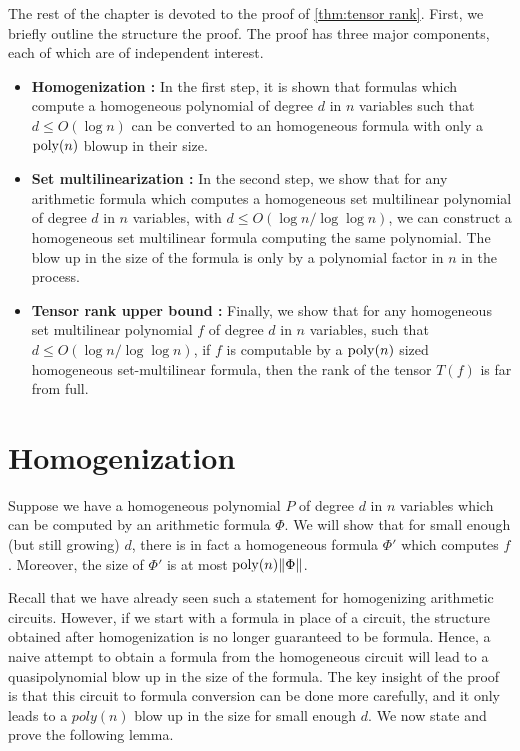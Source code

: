 The rest of the chapter is devoted to the proof of \autoref{thm:tensor rank}. First, we briefly outline the structure the proof. The proof has three major components, each of which are of independent interest. 
\begin{itemize}
\item {\bf Homogenization :} In the first step, it is shown that formulas which compute a homogeneous polynomial of degree $d$ in $n$ variables such that $d \leq O(\log n)$ can be converted to an homogeneous formula with only a $\operatorname{poly}(n)$ blowup in their size. 
\item {\bf Set multilinearization :} In the second step, we show that for any arithmetic formula which computes a homogeneous  set multilinear  polynomial of degree $d$ in $n$ variables, with $d \leq O(\log n/\log \log n)$, we can construct a homogeneous set multilinear formula computing the same polynomial. The blow up in the size of the formula is only by a polynomial factor in $n$ in the process. 
\item {\bf Tensor rank upper bound :} Finally, we  show that for any homogeneous set multilinear polynomial $f$ of degree $d$ in $n$ variables, such that $d \leq O(\log n/\log \log n) $, if $f$ is computable by a $\operatorname{poly}(n)$ sized homogeneous set-multilinear formula, then the rank of the tensor $T(f)$ is far from full. 
\end{itemize}


\section{Homogenization}\label{sec:homogenization}

Suppose we have a homogeneous polynomial $P$ of degree $d$ in $n$ variables which can be computed by an arithmetic formula $\Phi$. 
We will show that for small  enough (but still growing) $d$, there is in fact a homogeneous formula $\Phi'$ which computes $f$. Moreover, the size of $\Phi'$ is at most $\operatorname{poly}(n)\|\Phi \|$.

Recall that we have already seen such a statement for homogenizing  arithmetic circuits. However, if we start with a formula in place of a circuit, the structure obtained after homogenization is no longer guaranteed to be formula. Hence, a naive attempt to obtain a formula from the homogeneous circuit will lead to a quasipolynomial blow up in the size of the formula. The key insight of the proof  is that this circuit to formula conversion can be done more carefully, and it only leads to a $poly(n)$ blow up in the size for small enough $d$. We now state and prove the following lemma. 

